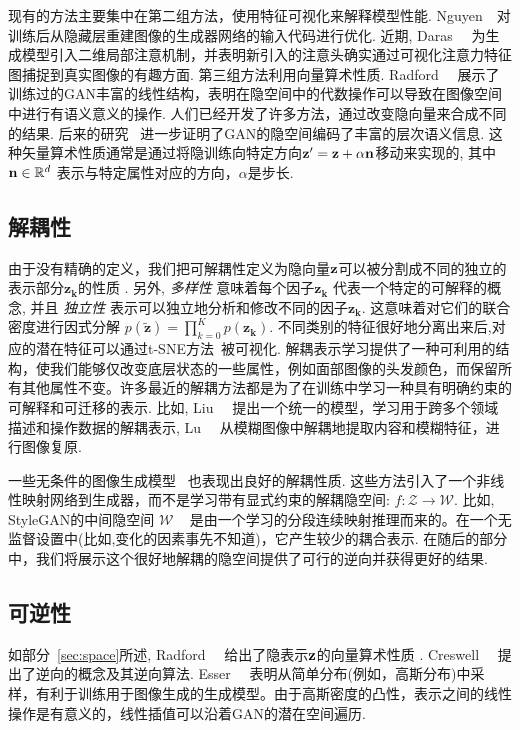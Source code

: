 现有的方法主要集中在第二组方法，使用特征可视化来解释模型性能. 
Nguyen~\etal~\cite{nguyen2016synthesizing}对训练后从隐藏层重建图像的生成器网络的输入代码进行优化. 
近期, Daras~\etal~\cite{daras2020your} 为生成模型引入二维局部注意机制，并表明新引入的注意头确实通过可视化注意力特征图捕捉到真实图像的有趣方面.
第三组方法利用向量算术性质. 
Radford~\etal~\cite{radford2016dcgan} 展示了训练过的GAN丰富的线性结构，表明在隐空间中的代数操作可以导致在图像空间中进行有语义意义的操作. 
人们已经开发了许多方法，通过改变隐向量来合成不同的结果. 
后来的研究~\cite{bau2019inverting,shen2020interpreting,zhu2020indomain} 进一步证明了GAN的隐空间编码了丰富的层次语义信息.
这种矢量算术性质通常是通过将隐训练向特定方向$\mathbf{z}^{\prime}=\mathbf{z}+\alpha \mathbf{n}$移动来实现的, 其中 $\mathbf{n} \in \mathbb{R}^{d}$ 表示与特定属性对应的方向，$\alpha$是步长.

\subsection{解耦性}
\label{sec:disentanglability}

由于没有精确的定义，我们把可解耦性定义为隐向量$\mathbf{z}$可以被分割成不同的独立的表示部分$\mathbf{z_k}$的性质 . 
另外, \textit{多样性} 意味着每个因子$\mathbf{z_k}$ 代表一个特定的可解释的概念, 并且 \textit{独立性} 表示可以独立地分析和修改不同的因子$\mathbf{z_k}$.
这意味着对它们的联合密度进行因式分解 $p(\mathbf{\tilde{z}})=\prod_{k=0}^{K} p(\mathbf{{z}_{k}})$.
不同类别的特征很好地分离出来后,对应的潜在特征可以通过t-SNE方法~\cite{maaten2008visualizing}被可视化. 
解耦表示学习提供了一种可利用的结构，使我们能够仅改变底层状态的一些属性，例如面部图像的头发颜色，而保留所有其他属性不变。许多最近的解耦方法都是为了在训练中学习一种具有明确约束的可解释和可迁移的表示. 
比如, Liu~\etal~\cite{liu2018unified} 提出一个统一的模型，学习用于跨多个领域描述和操作数据的解耦表示, 
Lu~\etal~\cite{lu2019unsupervised} 从模糊图像中解耦地提取内容和模糊特征，进行图像复原. 

一些无条件的图像生成模型~\cite{karras2019style,karras2020analyzing} 也表现出良好的解耦性质. 
这些方法引入了一个非线性映射网络到生成器，而不是学习带有显式约束的解耦隐空间: $f:\mathcal{Z} \to \mathcal{W}$. 
比如, StyleGAN的中间隐空间 $\mathcal{W}$ ~\cite{karras2019style} 是由一个学习的分段连续映射推理而来的。在一个无监督设置中(比如,变化的因素事先不知道)，它产生较少的耦合表示.
在随后的部分中，我们将展示这个很好地解耦的隐空间提供了可行的逆向并获得更好的结果.

\subsection{可逆性}
\label{sec:invertibility}
如部分~\ref{sec:space}所述, Radford~\etal~\cite{radford2016dcgan} 给出了隐表示$\mathbf{z}$的向量算术性质 .
Creswell~\etal~\cite{creswell2018inverting} 提出了逆向的概念及其逆向算法. 
Esser~\etal~\cite{esser2020invertible} 表明从简单分布(例如，高斯分布)中采样，有利于训练用于图像生成的生成模型。由于高斯密度的凸性，表示之间的线性操作是有意义的，线性插值可以沿着GAN的潜在空间遍历. 
 
